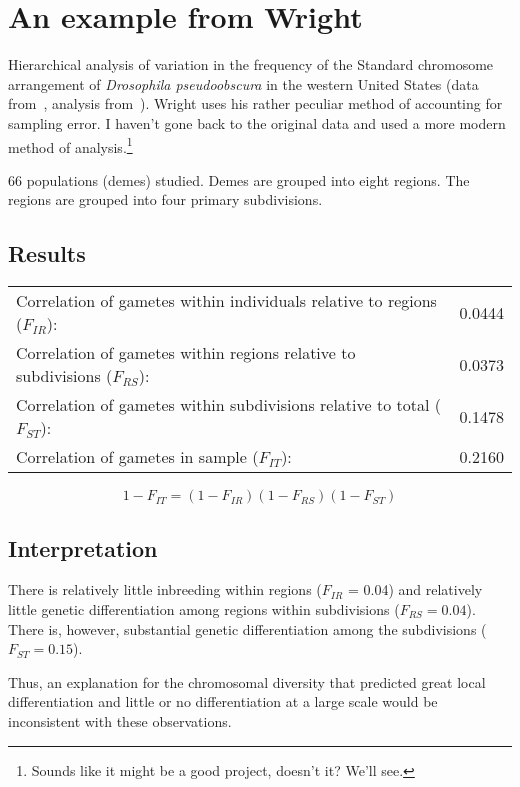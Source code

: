 \documentclass[12pt]{article}
\begin{document}
\section*{An example from Wright}

Hierarchical analysis of variation in the frequency of the Standard
chromosome arrangement of {\it Drosophila pseudoobscura\/} in the
western United States (data from~\cite{Dobzhansky-Epling-1944},
analysis from~\cite{Wright-1978}). Wright uses his rather peculiar method
of accounting for sampling error. I haven't gone back to the original
data and used a more modern method of analysis.\footnote{Sounds like
  it might be a good project, doesn't it? We'll see.}

66 populations (demes) studied.  Demes are grouped into eight regions.
The regions are grouped into four primary subdivisions.

\subsection*{Results}

\begin{center}
\begin{tabular}{lc}
Correlation of gametes within individuals relative to regions ($F_{IR}$): & 0.0444 \\
Correlation of gametes within regions relative to subdivisions ($F_{RS}$): & 0.0373 \\
Correlation of gametes within subdivisions relative to total ($F_{ST}$): & 0.1478 \\
Correlation of gametes in sample ($F_{IT}$): & 0.2160
\end{tabular}
\end{center}

\[
1 - F_{IT} = (1 - F_{IR})(1 - F_{RS})(1 - F_{ST})
\]

\subsection*{Interpretation}

There is relatively little inbreeding within regions ($F_{IR}$ = 0.04)
and relatively little genetic differentiation among regions within
subdivisions ($F_{RS} = 0.04$). There is, however, substantial genetic
differentiation among the subdivisions ($F_{ST} = 0.15$).

Thus, an explanation for the chromosomal diversity that predicted
great local differentiation and little or no differentiation at a
large scale would be inconsistent with these observations.




\ccLicense
\end{document}
